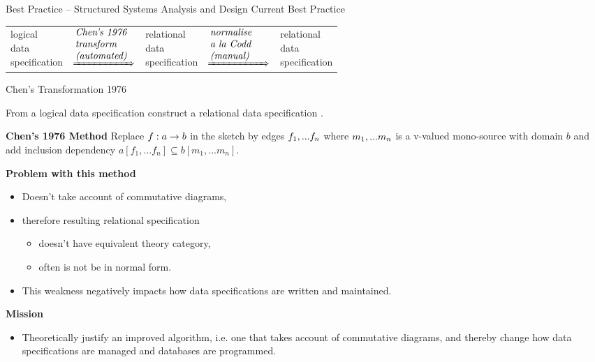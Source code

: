 \newcommand{\transone}{\parbox{2cm}{\textit{Chen's 1976\\transform \\(automated)}}}
\newcommand{\transtwo}{\parbox{2cm}{\textit{normalise \\ a la Codd \\(manual)}}}
\begin{frame}{Best Practice -- Structured Systems Analysis and Design}
Current Best Practice
\begin{center}
\begin{tabular}{ p{1.25cm} p{2cm} p{1.25cm} p{2cm}  p{1.25cm}}
\parbox{3cm}{logical \\ data \\ specification}&  $\xRightarrow{\transone}$ & \parbox{3cm}{relational \\ data \\specification} & $ \xRightarrow{\transtwo} $ & \parbox{3.5cm}{relational \\data \\specification}
\end{tabular}
\end{center}
\end{frame}

\begin{frame}{ Chen's Transformation 1976 }
\begin{construction}
From a logical data specification construct a relational data specification
. 
\end{construction}
\textbf{Chen's 1976 Method}
Replace $f:a \rightarrow b$ in the sketch by edges $f_1,...f_n$
where $m_1,...m_n$ is a v-valued mono-source with domain $b$ 
and add inclusion dependency 
$a[f_1,...f_n] \subseteq b[m_1,...m_n].$

\pause
\textbf{Problem with this method}
\begin{itemize}
	\item Doesn't take account of commutative diagrams,
	\item therefore resulting relational specification
	\begin{itemize}
		\item doesn't have equivalent theory category,
		\item often is not be in normal form.  
	\end{itemize}
	\item This weakness negatively impacts how data specifications are written and maintained.
\end{itemize}
\pause
\textbf{Mission}
\begin{itemize}
	\item Theoretically justify an improved algorithm, i.e. one that takes account of commutative diagrams, and thereby change how data specifications are managed and databases are programmed.
\end{itemize}
\end{frame}

